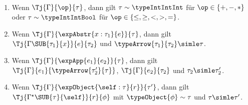 \begin{lemma} \label{lemma:Losrt:Umkehrung_der_Typrelation} \
  \begin{enumerate}
    \item Wenn $\Tj{\Gamma}{\op}{\tau}$, dann gilt $\tau \sim \typeIntIntInt$ f\"ur $\op\in\{+,-,*\}$ oder
          $\tau \sim \typeIntIntBool$ f\"ur $\op\in\{\le,\ge,<,>,=\}$.

    \item Wenn $\Tj{\Gamma}{\expAbstr{x:\tau_1}{e}}{\tau}$, dann gilt $\Tj{\Gamma\SUB{\tau_1}{x}}{e}{\tau_2}$
          und $\typeArrow{\tau_1}{\tau_2} \simle \tau$.

    \item Wenn $\Tj{\Gamma}{\expApp{e_1}{e_2}}{\tau}$, dann gilt $\Tj{\Gamma}{e_1}{\typeArrow{\tau_2'}{\tau}}$,
          $\Tj{\Gamma}{e_2}{\tau_2}$ und $\tau_2 \simle \tau_2'$.

    \item Wenn $\Tj{\Gamma}{\expObject{\self:\tau}{r}}{\tau'}$, dann gilt $\Tj{\Gamma^\star\SUB{\tau}{\self}}{r}{\phi}$
          mit $\typeObject{\phi} \sim \tau$ und $\tau \simle \tau'$.
  \end{enumerate}
\end{lemma}

